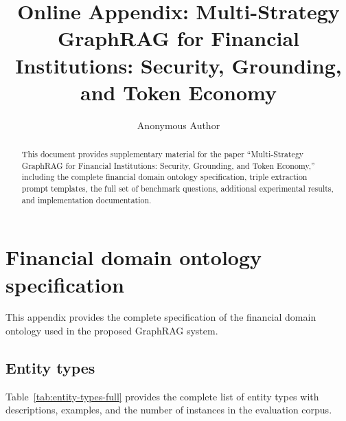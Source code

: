 \documentclass[review]{elsarticle}
\begin{document}
\begin{frontmatter}

\title{Online Appendix: Multi-Strategy GraphRAG for Financial Institutions: Security, Grounding, and Token Economy}

\author[inst1]{Anonymous Author}

\begin{abstract}
This document provides supplementary material for the paper ``Multi-Strategy GraphRAG for Financial Institutions: Security, Grounding, and Token Economy,'' including the complete financial domain ontology specification, triple extraction prompt templates, the full set of benchmark questions, additional experimental results, and implementation documentation.
\end{abstract}

\end{frontmatter}

\section{Financial domain ontology specification}
\label{app:ontology}

This appendix provides the complete specification of the financial domain ontology used in the proposed GraphRAG system.

\subsection{Entity types}

Table~\ref{tab:entity-types-full} provides the complete list of entity types with descriptions, examples, and the number of instances in the evaluation corpus.
\end{document}
